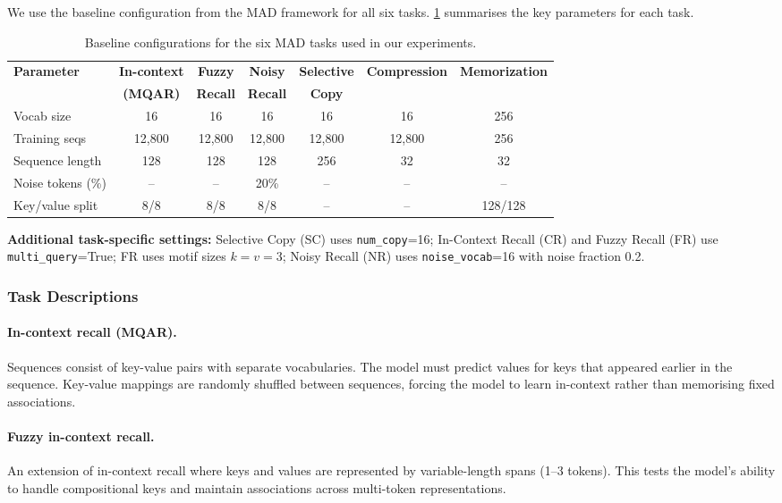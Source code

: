 \documentclass{article}
\begin{document}
We use the baseline configuration from the MAD framework for all six tasks. \cref{tab:mad-configs} summarises the key parameters for each task.

\begin{table}[h!]
\centering
\caption{Baseline configurations for the six MAD tasks used in our experiments.}
\label{tab:mad-configs}
\scriptsize
\setlength{\tabcolsep}{4pt}
\renewcommand{\arraystretch}{1.12}
\begin{tabular}{@{}lcccccc@{}}
\toprule
\textbf{Parameter} & \textbf{In-context} & \textbf{Fuzzy} & \textbf{Noisy} & \textbf{Selective} & \textbf{Compression} & \textbf{Memorization} \\
& \textbf{(MQAR)} & \textbf{Recall} & \textbf{Recall} & \textbf{Copy} & & \\
\midrule
Vocab size & 16 & 16 & 16 & 16 & 16 & 256 \\
Training seqs & 12,800 & 12,800 & 12,800 & 12,800 & 12,800 & 256 \\
Sequence length & 128 & 128 & 128 & 256 & 32 & 32 \\
Noise tokens (\%) & -- & -- & 20\% & -- & -- & -- \\
Key/value split & 8/8 & 8/8 & 8/8 & -- & -- & 128/128 \\
\bottomrule
\end{tabular}
\end{table}
\noindent\textbf{Additional task-specific settings:} Selective Copy (SC) uses \texttt{num\_copy}=16; In-Context Recall (CR) and Fuzzy Recall (FR) use \texttt{multi\_query}=True; FR uses motif sizes $k = v = 3$; Noisy Recall (NR) uses \texttt{noise\_vocab}=16 with noise fraction 0.2.
\subsubsection{Task Descriptions}
\label{sec:mad-descriptions}

\paragraph{In-context recall (MQAR).}
Sequences consist of key-value pairs with separate vocabularies. The model must predict values for keys that appeared earlier in the sequence. Key-value mappings are randomly shuffled between sequences, forcing the model to learn in-context rather than memorising fixed associations.

\paragraph{Fuzzy in-context recall.}
An extension of in-context recall where keys and values are represented by variable-length spans (1--3 tokens). This tests the model's ability to handle compositional keys and maintain associations across multi-token representations.
\end{document}
